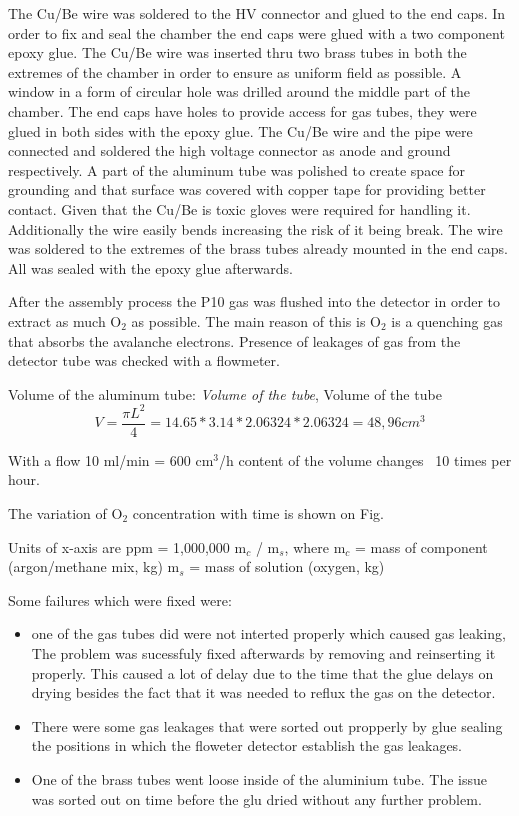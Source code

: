 The Cu/Be wire was soldered to the HV
connector and glued to the end caps. In order to fix and seal the chamber the end caps were glued with a two component epoxy glue.
The Cu/Be wire was inserted thru two brass tubes in both the extremes of the chamber in order to ensure as uniform field as possible. 
A window in a form of circular hole was drilled around the middle part of the chamber. The end caps have holes to provide access for gas tubes, they were glued in both sides with the epoxy glue. 
The Cu/Be wire and the pipe were connected and soldered  the high voltage connector as anode and ground respectively. A part of the aluminum tube was polished to create space for grounding and that surface was covered with copper tape for providing better contact.
 Given that the Cu/Be is toxic gloves were required for handling it. 
Additionally the wire easily bends increasing the risk of it being break. The wire was soldered to the extremes of the brass tubes already mounted in the end caps. All was sealed with the epoxy glue afterwards.


After the assembly process the P10 gas was flushed into the detector in order to extract as much O$_2$ as possible. The main reason of this is O$_2$ is a quenching gas that absorbs the avalanche electrons.
Presence of leakages of gas from the detector tube was checked with a flowmeter.

Volume of the aluminum tube:
\emph{Volume of the tube}, Volume of the tube
\begin{equation}
  \label{eq:tube_volume}
  V=\frac{\pi L^2}{4} =14.65*3.14*2.06324*2.06324=48,96 cm^3
\end{equation}

With a flow 10 ml/min = 600 cm$^3$/h content of the volume changes ~10 times per hour.

The variation of O$_{2}$ concentration with time is shown on Fig.

Units of x-axis are ppm = 1,000,000 m$_{c}$ / m$_{s}$, where 
m$_{c}$ = mass of component (argon/methane mix, kg)
m$_{s}$ = mass of solution (oxygen, kg)




Some failures which were fixed were:
\begin{itemize}
  \item one of the gas tubes did were not interted properly which caused gas leaking, The problem was sucessfuly fixed afterwards by removing and reinserting it properly. 
  This caused a lot of delay due to the time that the glue delays on drying besides the fact that it was needed to reflux the gas on the detector.
  \item There were some gas leakages that were sorted out propperly by glue sealing the positions in which the floweter detector establish the gas leakages.
  \item One of the brass tubes went loose inside of the aluminium tube. The issue was sorted out on time before the glu dried without any further problem.
\end{itemize}

